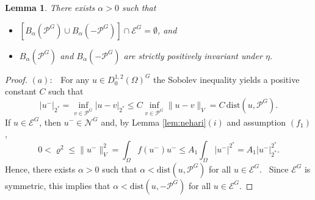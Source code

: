 \documentclass[10pt,letterpaper]{article}
\newtheorem{lemma}[theorem]{Lemma}
\numberwithin{equation}{section}
\def\io{\int_{\Omega}}
\def\vr{\varrho}
\def\o{\Omega}
\def\cE{\mathcal{E}}
\def\cN{\mathcal{N}}
\def\cP{\mathcal{P}}
\begin{document}
\begin{lemma}\label{lem:equator} There exists $\alpha >0$ such that
\begin{itemize}
\item [$(a)$] $[B_{\alpha} (\cP^G) \cup B_{\alpha}(- \cP^G)] \cap \cE^G = \emptyset$, and
\item [$(b)$] $B_{\alpha} ( \cP^G)$ and $B_{\alpha}(- \cP^G)$ are strictly positively invariant under $\eta$.
\end{itemize}
\end{lemma}

\begin{proof} 
$(a):$ \ For any $u \in D^{1,2}_0(\o)^G$ the Sobolev inequality yields a positive constant $C$ such that
\begin{equation} \label{eq:dist}
|u^{-}|_{2^*} = \inf_{v \in \mathcal{P}^G} |u-v|_{2^*} \leq C \inf_{v \in \cP^G} \|u-v \|_V = C \,\mathrm{dist}(u, \mathcal{P}^G).
\end{equation}
If $u\in\cE^G$, then $u^-\in \cN^G$ and, by Lemma \ref{lem:nehari}$(i)$ and assumption $(f_1)$, 
$$0<\vr^2\leq\|u^-\|_V^2 = \io f(u^-)u^- \leq A_1\io|u^-|^{2^*} = A_1|u^-|_{2^*}^{2^*}.$$
Hence, there exists $\alpha>0$ such that $\alpha < \mathrm{dist}(u,\cP^G )$ for all $u \in \cE^G$. \ Since $\cE^G$ is symmetric, this implies that $\alpha < \mathrm{dist}(u,-\cP^G )$ for all $u \in \cE^G$.


\end{proof}
\end{document}
